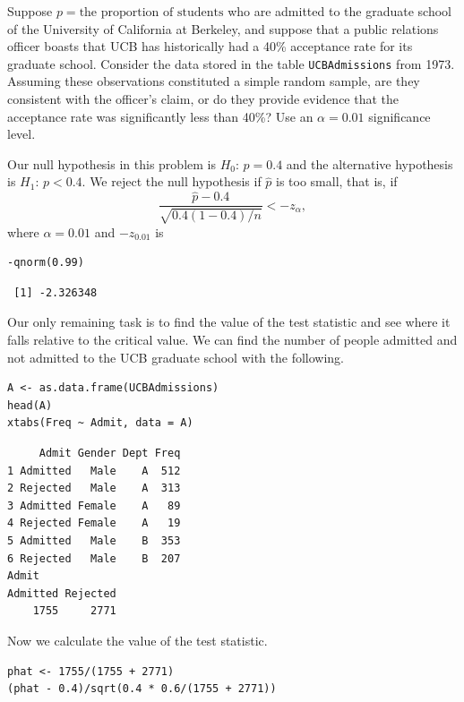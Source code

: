 \documentclass[captions=tableheading]{scrbook}
\begin{document}
\begin{example}

Suppose \(p=\mbox{the proportion of students}\) who are admitted to the graduate school of the University of California at Berkeley, and suppose that a public relations officer boasts that UCB has historically had a 40\% acceptance rate for its graduate school. Consider the data stored in the table \texttt{UCBAdmissions} from 1973. Assuming these observations constituted a simple random sample, are they consistent with the officer's claim, or do they provide evidence that the acceptance rate was significantly less than 40\%? Use an \(\alpha=0.01\) significance level.

Our null hypothesis in this problem is \(H_{0}:\, p=0.4\) and the alternative hypothesis is \(H_{1}:\, p<0.4\). We reject the null hypothesis if \(\hat{p}\) is too small, that is, if
\begin{equation} 
\frac{\hat{p}-0.4}{\sqrt{0.4(1-0.4)/n}}<-z_{\alpha},
\end{equation}
where \(\alpha=0.01\) and \(-z_{0.01}\) is 

\lstset{language=R}
\begin{lstlisting}
-qnorm(0.99)
\end{lstlisting}

\begin{verbatim}
 [1] -2.326348
\end{verbatim}

Our only remaining task is to find the value of the test statistic and see where it falls relative to the critical value. We can find the number of people admitted and not admitted to the UCB graduate school with the following. 


\lstset{language=R}
\begin{lstlisting}
A <- as.data.frame(UCBAdmissions)
head(A)
xtabs(Freq ~ Admit, data = A)
\end{lstlisting}


\begin{verbatim}
     Admit Gender Dept Freq
1 Admitted   Male    A  512
2 Rejected   Male    A  313
3 Admitted Female    A   89
4 Rejected Female    A   19
5 Admitted   Male    B  353
6 Rejected   Male    B  207
Admit
Admitted Rejected 
    1755     2771
\end{verbatim}

Now we calculate the value of the test statistic.


\lstset{language=R}
\begin{lstlisting}
phat <- 1755/(1755 + 2771)
(phat - 0.4)/sqrt(0.4 * 0.6/(1755 + 2771))
\end{lstlisting}


\end{example}
\end{document}
